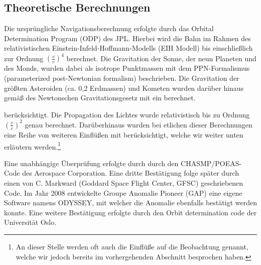 
\subsection{Theoretische Berechnungen}
Die ursprüngliche Navigationsberechnung erfolgte durch das Orbital Determination Program (ODP) des JPL.
Hierbei wird die Bahn im Rahmen des relativistischen Einstein-Infeld-Hoffmann-Modells (EIH Modell)
bis einschließlich zur Ordnung $(\frac{v}{c})^4$ berechnet.
Die Gravitation der Sonne, der neun Planeten und des Monds, wurden dabei als isotrope Punktmassen mit dem
PPN-Formalismus (parameterized post-Newtonian formalism) beschrieben\cite{Anderson2002}. Die Gravitation der größten
Asteroiden (ca. 0,2 Erdmassen) und Kometen wurden darüber hinaus gemäß des Newtonschen Gravitationsgesetz mit
ein berechnet.

berücksichtigt.
Die Propagation des Lichtes wurde relativistisch bis zu Ordnung $(\frac{v}{c})^2$ genau berechnet.
Darüberhinaus wurden bei etlichen dieser Berechnungen eine Reihe von weiteren Einflüßen mit berücksichtigt, welche wir
weiter unten %
erläutern werden.\footnote{An dieser Stelle werden oft auch die Einflüße auf die Beobachtung genannt, welche wir jedoch
bereits im vorhergehenden Abschnitt besprochen haben.}

Eine unabhängige Überprüfung erfolgte durch durch den CHASMP/POEAS-Code des Aerospace Corporation.
Eine dritte Bestätigung folge später durch einen von C. Markward (Goddard Space Flight Center, GFSC) geschriebenen Code.
Im Jahr 2008 entwickelte Groupe Anomalie Pioneer (GAP) eine eigene Software namens ODYSSEY,
mit welcher die Anomalie ebenfalls bestätigt werden konnte.
Eine weitere Bestätigung erfolgte durch den Orbit determination code der Universität Oslo.